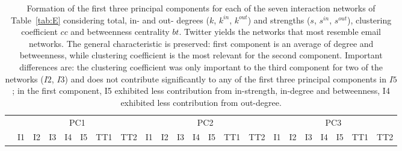 \documentclass[%
 aip,
 jmp,%
 amsmath,amssymb,
 reprint,%
 floatfix,
]{revtex4-1}
\begin{document}
\begin{table}[!h]
	\caption{Formation of the first three principal components for each of the seven interaction networks of Table~\ref{tab:E} considering total, in- and out- degrees ($k$, $k^{in}$, $k^{out}$) and strengths ($s$, $s^{in}$, $s^{out}$), clustering coefficient $cc$ and betweenness centrality $bt$.
	Twitter yields the networks that most resemble email networks.
The general characteristic is preserved: first component is an average of degree and betweenness, while clustering coefficient is the most relevant for the second component.
Important differences are:
the clustering coefficient was only important to the third component for two of the networks ($I2$, $I3$) and does not contribute significantly to any of the first three principal components in $I5$;
in the first component, I5 exhibited less contribution from in-strength, in-degree and betweenness, I4 exhibited less contribution from out-degree.}
	\footnotesize
	\begin{center}
		\begin{tabular}{| l ||  c |c |c |c |c | c | c || c | c | c | c | c | c | c || c |c |c |c |c | c | c |	}\cline{2-22}
			\multicolumn{1}{c|}{} & \multicolumn{7}{c||}{PC1}          & \multicolumn{7}{c||}{PC2} & \multicolumn{7}{c|}{PC3}  \\\cline{2-22}
			\multicolumn{1}{c|}{} & 
			I1 & I2 & I3 & I4 & I5 & TT1 & TT2 &
			I1 & I2 & I3 & I4 & I5 & TT1 & TT2 &
			I1 & I2 & I3 & I4 & I5 & TT1 & TT2 \\\hline
			
			\hline
		\end{tabular}
	\end{center}
	\label{tab:pcaE2}
\end{table}
\end{document}
